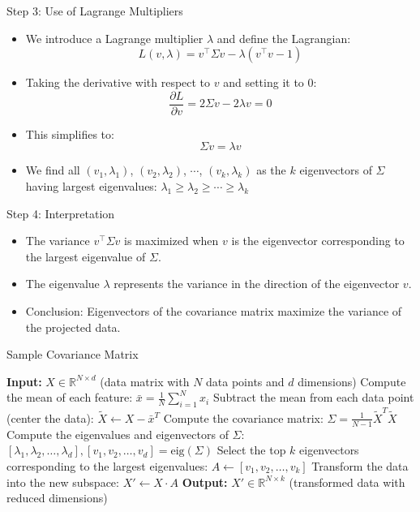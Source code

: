 \documentclass[serif, aspectratio=169]{beamer}
\begin{document}
\begin{frame}{Step 3: Use of Lagrange Multipliers}
    \begin{itemize}
        \item We introduce a Lagrange multiplier \( \lambda \) and define the Lagrangian:
        \[
        L(v, \lambda) = v^\top \Sigma v - \lambda (v^\top v - 1)
        \]
        \item Taking the derivative with respect to \( v \) and setting it to 0:
        \[
        \frac{\partial L}{\partial v} = 2 \Sigma v - 2 \lambda v = 0
        \]
        \item This simplifies to:
        \[
        \Sigma v = \lambda v
        \]
        \item We find all $(v_1, \lambda_1)$, $(v_2, \lambda_2)$, $\cdots$, $(v_k, \lambda_k)$ as the $k$ eigenvectors of $\Sigma$ having largest eigenvalues: $\lambda_1 \geq \lambda_2 \geq \cdots \geq \lambda_k$ 
    \end{itemize}
\end{frame}

\begin{frame}{Step 4: Interpretation}
    \begin{itemize}
        \item The variance \( v^\top \Sigma v \) is maximized when \( v \) is the eigenvector corresponding to the largest eigenvalue of \( \Sigma \).
        \item The eigenvalue \( \lambda \) represents the variance in the direction of the eigenvector \( v \).
        \item Conclusion: Eigenvectors of the covariance matrix maximize the variance of the projected data.
    \end{itemize}
\end{frame}

\begin{frame}{Sample Covariance Matrix}
    \begin{algorithm}[H]
    \caption{Sample Covariance Matrix}\label{alg:Sample Covariance Matrix}
    \begin{algorithmic}[1]
        \State \textbf{Input:} $X \in \mathbb{R}^{N \times d}$ (data matrix with $N$ data points and $d$ dimensions)
        \State Compute the mean of each feature:  $\bar{x} = \frac{1}{N} \sum_{i=1}^{N} x_i$
        \State Subtract the mean from each data point (center the data): $\tilde{X} \leftarrow X - \bar{x}^{T}$
        \State Compute the covariance matrix: $\Sigma = \frac{1}{N - 1} \tilde{X}^{T} \tilde{X}$
        \State Compute the eigenvalues and eigenvectors of $\Sigma$: $[\lambda_1, \lambda_2, \dots, \lambda_d], [v_1, v_2, \dots, v_d] = \text{eig}(\Sigma)$
        \State Select the top $k$ eigenvectors corresponding to the largest eigenvalues: $A \leftarrow [v_1, v_2, \dots, v_k]$
        \State Transform the data into the new subspace: $X' \leftarrow X \cdot A$
        \State \textbf{Output:} $X' \in \mathbb{R}^{N \times k}$ (transformed data with reduced dimensions)
    \end{algorithmic}
    \end{algorithm}
\end{frame}
\end{document}

